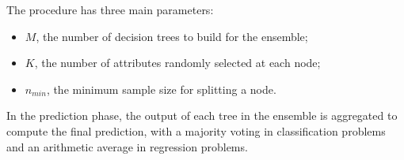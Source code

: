 The procedure has three main parameters: 
\begin{itemize}
    \item $M$, the number of decision trees to build for the ensemble;
    \item $K$, the number of attributes randomly selected at each node;
    \item $n_{min}$, the minimum sample size for splitting a node. 
\end{itemize}
In the prediction phase, the output of each tree in the ensemble is aggregated
to compute the final prediction, with a majority voting in classification 
problems and an arithmetic average in regression problems.


























